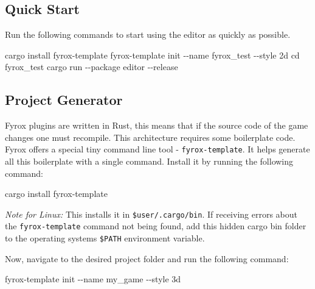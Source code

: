 \documentclass[
]{book}
\newenvironment{Shaded}{\begin{snugshade}}{\end{snugshade}}
\newcommand{\AttributeTok}[1]{\textcolor[rgb]{0.13,0.29,0.53}{#1}}
\newcommand{\BuiltInTok}[1]{#1}
\newcommand{\ExtensionTok}[1]{#1}
\newcommand{\NormalTok}[1]{#1}
\theoremstyle{definition}
\theoremstyle{definition}
\theoremstyle{definition}
\theoremstyle{definition}
\theoremstyle{remark}
\begin{document}
\subsection{Quick Start}\label{quick-start}

Run the following commands to start using the editor as quickly as possible.

\begin{Shaded}
\begin{Highlighting}[]
\ExtensionTok{cargo}\NormalTok{ install fyrox{-}template}
\ExtensionTok{fyrox{-}template}\NormalTok{ init }\AttributeTok{{-}{-}name}\NormalTok{ fyrox\_test }\AttributeTok{{-}{-}style}\NormalTok{ 2d}
\BuiltInTok{cd}\NormalTok{ fyrox\_test}
\ExtensionTok{cargo}\NormalTok{ run }\AttributeTok{{-}{-}package}\NormalTok{ editor }\AttributeTok{{-}{-}release}
\end{Highlighting}
\end{Shaded}

\subsection{Project Generator}\label{project-generator}

Fyrox plugins are written in Rust, this means that if the source code of the game changes one must recompile. This architecture requires some boilerplate code. Fyrox offers a special tiny command line tool - \texttt{fyrox-template}. It helps generate all this boilerplate with a single command. Install it by running the following command:

\begin{Shaded}
\begin{Highlighting}[]
\NormalTok{cargo install fyrox{-}template}
\end{Highlighting}
\end{Shaded}

\emph{Note for Linux:} This installs it in \texttt{\$user/.cargo/bin}. If receiving errors about the \texttt{fyrox-template} command not being found, add this hidden cargo bin folder to the operating systems \texttt{\$PATH} environment variable.

Now, navigate to the desired project folder and run the following command:

\begin{Shaded}
\begin{Highlighting}[]
\NormalTok{fyrox{-}template init {-}{-}name my\_game {-}{-}style 3d}
\end{Highlighting}
\end{Shaded}
\end{document}
